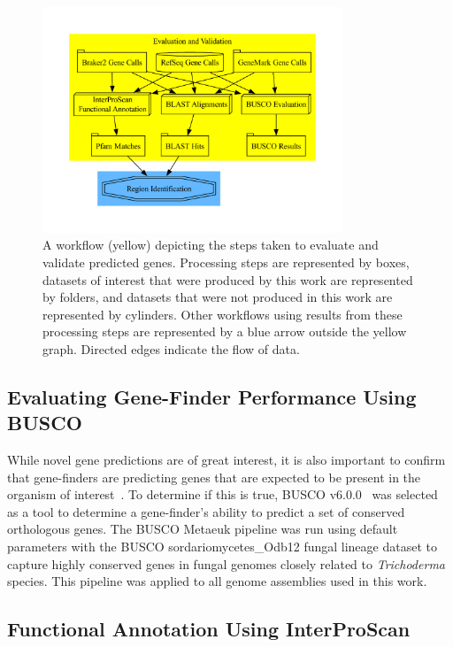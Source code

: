 \begin{figure}
  \centering
  \includegraphics[width=0.8\textwidth]{figures/eval-met.pdf}
  \caption[Gene evaluation and validation workflow]{A workflow (yellow) depicting the steps taken to evaluate
    and validate predicted genes. Processing steps are represented by
    boxes, datasets of interest that were produced by this work are
    represented by folders, and datasets that were not produced in
    this work are represented by cylinders. Other workflows using
    results from these processing steps are represented by a
    blue arrow outside the yellow graph. Directed edges
    indicate the flow of data.}\label{fig:valid}
\end{figure}

\subsection{Evaluating Gene-Finder Performance Using BUSCO}\label{met:busco}

While novel gene predictions are of great interest, it
is also important to confirm that gene-finders are predicting genes
that are expected to be present in the organism of
interest~\cite{manni2021b}. To determine if this
is true, BUSCO v6.0.0~\cite{simao2015a} was selected
as a tool to determine a gene-finder's ability to predict a set of
conserved orthologous genes. The BUSCO Metaeuk pipeline was run using default parameters with the BUSCO sordariomycetes\_Odb12 fungal lineage dataset to capture highly
conserved genes in fungal genomes closely related to \textit{Trichoderma} species. This pipeline was applied to all
genome assemblies used in this work.

\subsection{Functional Annotation Using InterProScan}\label{met:interproscan}

